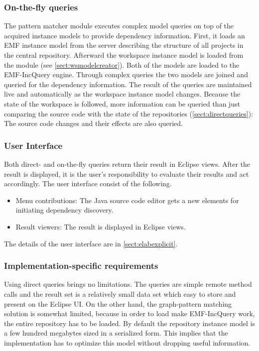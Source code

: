 \subsubsection{On-the-fly queries}
The pattern matcher module executes complex model queries on top of the acquired
instance models to provide dependency information. First, it loads an EMF
instance model from the server describing the structure of all projects in the
central repository. Afterward the workspace instance model is loaded from the
module (see \autoref{sect:wsmodelcreator}). Both of the models are loaded to the
EMF-IncQuery engine. Through complex queries the two models are joined and
queried for the dependency information. The result of the queries are maintained
live and automatically as the workspace instance model changes. Because the
state of the workspace is followed, more information can be queried than just
comparing the source code with the state of the repositories
(\autoref{sect:directqueries}): The source code changes and their effects
are also queried.

\subsubsection{User Interface}
Both direct- and on-the-fly queries return their result in Eclipse views. After
the result is displayed, it is the user's responsibility to evaluate their
results and act accordingly. The user interface consist of the following.
\begin{itemize}
  \item Menu contributions: The Java source code editor gets a new elements for 
initiating dependency discovery.
  \item Result viewers: The result is displayed in Eclipse views.
\end{itemize}
The details of the user interface are in \autoref{sect:elabexplicit}.

\subsubsection{Implementation-specific requirements}
Using direct queries brings no limitations. The queries are simple remote method
calls and the result set is a relatively small data set which easy to store and
present on the Eclipse UI. On the other hand, the graph-pattern matching
solution is somewhat limited, because in order to load make EMF-IncQuery work,
the entire repository has to be loaded. By default the repository instance model
is a few hundred megabytes sized in a serialized form. This implies that the
implementation has to optimize this model without dropping useful information.

